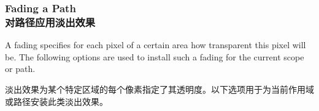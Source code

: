 \subsubsection{Fading a Path\\对路径应用淡出效果}

A fading specifies for each pixel of a certain area how transparent this pixel
will be. The following options are used to install such a fading for the
current scope or path.

淡出效果为某个特定区域的每个像素指定了其透明度。以下选项用于为当前作用域或路径安装此类淡出效果。


